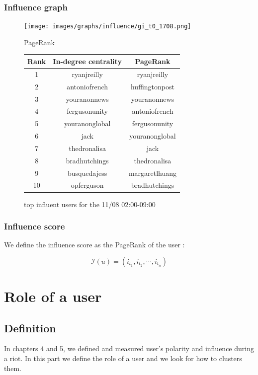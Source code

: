 \documentclass[a4paper,twoside,12pt,openright]{report}
\begin{document}
\subsection{Influence graph}
\begin{figure}[H]
\centering
\texttt{[image: images/graphs/influence/gi\_t0\_1708.png]}
\caption{PageRank}
\end{figure}

\begin{figure}[H]
  \centering
\begin{tabular}{ccc}
\hline
Rank & \textbf{In-degree centrality} & \textbf{PageRank}\\ \hline \hline
1 & ryanjreilly & ryanjreilly \\ \hline
2 & antoniofrench & \cellcolor{red!20} huffingtonpost \\ \hline
3 & youranonnews & youranonnews \\ \hline
4 & fergusonunity & antoniofrench \\ \hline
5 & youranonglobal & fergusonunity \\ \hline
6 & jack & youranonglobal \\ \hline
7 & thedronalisa & jack \\ \hline
8 & bradhutchings & thedronalisa \\ \hline
9 & \cellcolor{red!20}busquedajess & \cellcolor{red!20}margaretlhuang \\ \hline
10 & \cellcolor{red!20}opferguson & bradhutchings \\ \hline
\hline
\end{tabular}
\caption{top influent users for the 11/08 02:00-09:00}
\end{figure}
	
\newpage

\subsection{Influence score}
We define the influence score as the PageRank of the user : 

$$ \mathcal{I}(u) = (i_{t_1},i_{t_2},\cdots,i_{t_n}) $$

\chapter{Role of a user}

\section{Definition}
In chapters 4 and 5, we defined and measured user's polarity and influence during a riot. In this part we define the role of a user and we look for how to clusters them.
\end{document}
